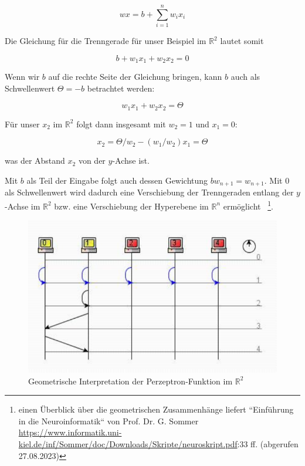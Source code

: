 \begin{equation}
wx = b + \sum^n_{i=1} w_ix_i
\label{eq:gl-net}
\end{equation}

\noindent
Die Gleichung für die Trenngerade für unser Beispiel im $\mathbb{R}^2$ lautet somit

\begin{equation}
b + w_1x_1 + w_2x_2 = 0
\end{equation}

\noindent
Wenn wir $b$ auf die rechte Seite der Gleichung bringen, kann $b$ auch als Schwellenwert $\Theta = -b$ betrachtet werden:

\begin{equation}
w_1x_1 + w_2x_2 = \Theta
\end{equation}

\noindent
Für unser $x_2$ im $ \mathbb{R}^2$ folgt dann insgesamt mit $w_2 = 1$ und $x_1 = 0$:

\begin{equation}
x_2 = \Theta/w_2 -(w_1/w_2)x_1  = \Theta
\end{equation}

\noindent
was der Abstand $x_2$ von der $y$-Achse ist.

\noindent
Mit $b$ als Teil der Eingabe folgt auch dessen Gewichtung $bw_{n+1} = w_{n+1}$.
Mit $0$ als Schwellenwert wird dadurch eine Verschiebung der Trenngeraden entlang der $y$-Achse im $ \mathbb{R}^2$ bzw. eine Verschiebung der Hyperebene im $ \mathbb{R}^n$ ermöglicht~\cite[215]{Ert21a} \footnote{
    einen Überblick über die geometrischen Zusammenhänge liefert ``Einführung in die Neuroinformatik`` von Prof. Dr. G. Sommer \url{https://www.informatik.uni-kiel.de/inf/Sommer/doc/Downloads/Skripte/neuroskript.pdf}:33 ff. (abgerufen 27.08.2023)
}.

\begin{figure}[h]
    \centering
    \includegraphics{images/p1ReadSeq.pdf}
    \caption{Geometrische Interpretation der Perzeptron-Funktion im $\mathbb{R}^2$}
    \label{fig-geominterpretation}
\end{figure}

